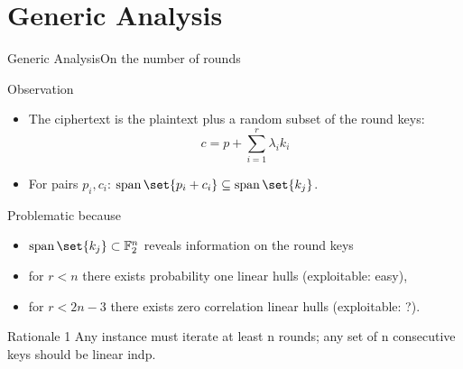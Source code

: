 \section{Generic Analysis}
\begin{frame}{Generic Analysis}{On the number of rounds}
    \vspace{-20pt}
    \begin{minipage}[t][85pt][t]{0.47\textwidth}
        \begin{block}{Observation\vpPp}
            \begin{itemize}
                \item The ciphertext is the plaintext plus a random subset of the round keys:
                    \begin{equation*}
                        c = p + \sum_{i=1}^{r} \lambda_i k_i
                    \end{equation*}
                \item For pairs $p_i, c_i$: $\Span \set{p_i + c_i} \subseteq \Span \set{k_j}$.
            \end{itemize}
            \vspace{5pt}
        \end{block}
    \end{minipage}
    \hfill
    \begin{minipage}[t][85pt][t]{0.47\textwidth}
        \begin{alertblock}{Problematic because\vpPp}
            \vspace{1.5pt}
            \begin{itemize}
                \item $\Span \set{k_j} \subset \F_2^n$ reveals information on the round keys\\[7pt]
                \item for $r < n$ there exists probability one linear hulls (exploitable: easy),\\[7pt]
                \item for $r < 2n - 3$ there exists zero correlation linear hulls (exploitable: ?).
            \end{itemize}
            \vspace{5pt}
        \end{alertblock}
    \end{minipage}

    \vspace{50pt}

    \begin{minipage}{0.985\textwidth}
    \begin{exampleblock}{Rationale 1}
        Any instance must iterate at least n rounds; any set of n consecutive keys should be linear indp.
    \end{exampleblock}
    \end{minipage}
\end{frame}


